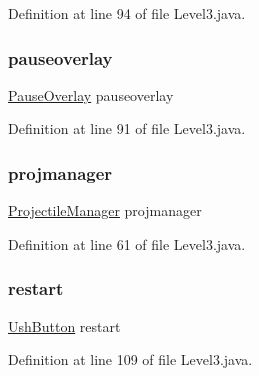 Definition at line 94 of file Level3.\+java.

\mbox{\label{classscenes_1_1_level3_a544fb9294d892e35b4b0316e07997cd6}} 
\subsubsection{\texorpdfstring{pauseoverlay}{pauseoverlay}}
{\footnotesize\ttfamily \hyperlink{classui_1_1_pause_overlay}{Pause\+Overlay} pauseoverlay\hspace{0.3cm}{\ttfamily [private]}}



Definition at line 91 of file Level3.\+java.

\mbox{\label{classscenes_1_1_level3_aee34cf906685787259a2edd7d4559863}} 
\subsubsection{\texorpdfstring{projmanager}{projmanager}}
{\footnotesize\ttfamily \hyperlink{classmanagers_1_1_projectile_manager}{Projectile\+Manager} projmanager\hspace{0.3cm}{\ttfamily [private]}}



Definition at line 61 of file Level3.\+java.

\mbox{\label{classscenes_1_1_level3_ac1d34384911014e49613ccfb1abddbcc}} 
\subsubsection{\texorpdfstring{restart}{restart}}
{\footnotesize\ttfamily \hyperlink{classui_1_1_ush_button}{Ush\+Button} restart\hspace{0.3cm}{\ttfamily [private]}}



Definition at line 109 of file Level3.\+java.

